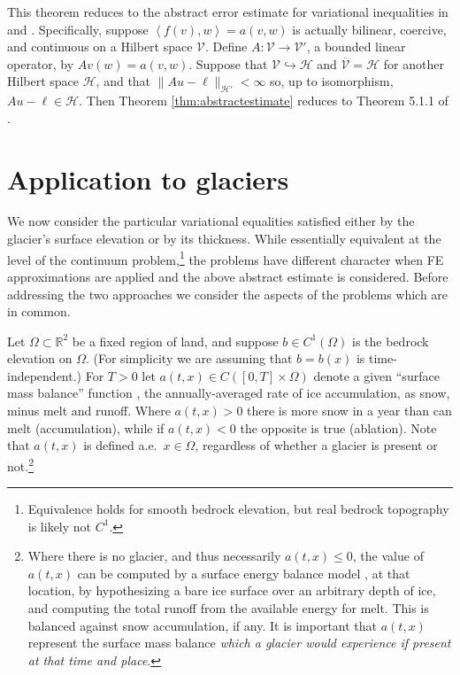 \documentclass[hidelinks,onefignum,onetabnum,final]{siamart220329}  %
\newcommand{\RR}{\mathbb{R}}
\newcommand{\cH}{\mathcal{H}}
\newcommand{\cV}{\mathcal{V}}
\newcommand{\ip}[2]{\left<#1,#2\right>}
\begin{document}
This theorem reduces to the abstract error estimate for variational inequalities in \cite{Ciarlet2002} and \cite{Falk1974}.  Specifically, suppose $\ip{f(v)}{w}=a(v,w)$ is actually bilinear, coercive, and continuous on a Hilbert space $\cV$.  Define $A:\cV\to\cV'$, a bounded linear operator, by $Av(w) = a(v,w)$.  Suppose that $\cV\hookrightarrow \cH$ and $\overline{\cV} = \cH$ for another Hilbert space $\cH$, and that $\|Au-\ell\|_{\cH'} < \infty$ so, up to isomorphism, $Au-\ell \in\cH$.  Then Theorem \ref{thm:abstractestimate} reduces to Theorem 5.1.1 of \cite{Ciarlet2002}.


\section{Application to glaciers} \label{sec:application}

We now consider the particular variational equalities satisfied either by the glacier's surface elevation or by its thickness.  While essentially equivalent at the level of the continuum problem,\footnote{Equivalence holds for smooth bedrock elevation, but real bedrock topography is likely not $C^1$.} the problems have different character when FE approximations are applied and the above abstract estimate is considered.  Before addressing the two approaches we consider the aspects of the problems which are in common.

Let $\Omega \subset \RR^2$ be a fixed region of land, and suppose $b \in C^1(\Omega)$ is the bedrock elevation on $\Omega$.  (For simplicity we are assuming that $b=b(x)$ is time-independent.)  For $T>0$ let $a(t,x) \in C([0,T] \times \Omega)$ denote a given ``surface mass balance'' function \cite{GreveBlatter2009}, the annually-averaged rate of ice accumulation, as snow, minus melt and runoff.  Where $a(t,x)>0$ there is more snow in a year than can melt (accumulation), while if $a(t,x)<0$ the opposite is true (ablation).  Note that $a(t,x)$ is defined a.e.~$x\in \Omega$, regardless of whether a glacier is present or not.\footnote{Where there is no glacier, and thus necessarily $a(t,x) \le 0$, the value of $a(t,x)$ can be computed by a surface energy balance model \cite{GreveBlatter2009}, at that location, by hypothesizing a bare ice surface over an arbitrary depth of ice, and computing the total runoff from the available energy for melt.  This is balanced against snow accumulation, if any.  It is important that $a(t,x)$ represent the surface mass balance \emph{which a glacier would experience if present at that time and place}.}
\end{document}
